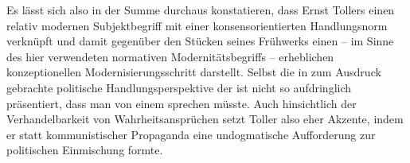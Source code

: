 Es lässt sich also in der Summe durchaus konstatieren, dass Ernst Tollers
\Cite{Zeitstück} einen relativ modernen Subjektbegriff mit einer
konsensorientierten Handlungsnorm verknüpft und damit gegenüber den
 Stücken seines Frühwerks einen -- im Sinne des hier
verwendeten normativen Modernitätsbegriffs -- erheblichen konzeptionellen
Modernisierungsschritt darstellt. 
Selbst die in  zum Ausdruck gebrachte politische
Handlungsperspektive der  ist nicht so
aufdringlich präsentiert, dass man von einem 
sprechen müsste. Auch hinsichtlich der Verhandelbarkeit von
Wahrheitsansprüchen setzt Toller also eher  Akzente, indem er
statt kommunistischer Propaganda eine undogmatische Aufforderung zur
politischen Einmischung formte. 
























